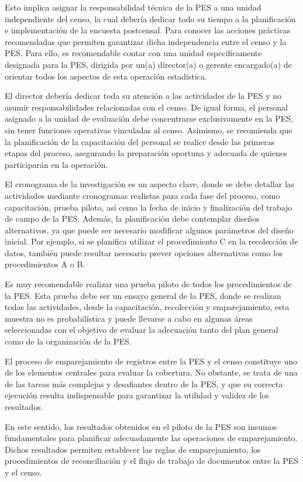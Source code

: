 \documentclass[
  12pt,
]{book}
\begin{document}
Esto implica asignar la responsabilidad técnica de la PES a una unidad independiente del censo, la cual debería dedicar todo su tiempo a la planificación e implementación de la encuesta postcensal. Para conocer las acciones prácticas recomendadas que permiten garantizar dicha independencia entre el censo y la PES. Para ello, es recomendable contar con una unidad específicamente designada para la PES, dirigida por un(a) director(a) o gerente encargado(a) de orientar todos los aspectos de esta operación estadística.

El director debería dedicar toda su atención a las actividades de la PES y no asumir responsabilidades relacionadas con el censo. De igual forma, el personal asignado a la unidad de evaluación debe concentrarse exclusivamente en la PES, sin tener funciones operativas vinculadas al censo. Asimismo, se recomienda que la planificación de la capacitación del personal se realice desde las primeras etapas del proceso, asegurando la preparación oportuna y adecuada de quienes participarán en la operación.

El cronograma de la investigación es un aspecto clave, donde se debe detallar las actividades mediante cronogramas realistas para cada fase del proceso, como capacitación, prueba piloto, así como la fecha de inicio y finalización del trabajo de campo de la PES. Además, la planificación debe contemplar diseños alternativos, ya que puede ser necesario modificar algunos parámetros del diseño inicial. Por ejemplo, si se planifica utilizar el procedimiento C en la recolección de datos, también puede resultar necesario prever opciones alternativas como los procedimientos A o B.

Es muy recomendable realizar una prueba piloto de todos los procedimientos de la PES. Esta prueba debe ser un ensayo general de la PES, donde se realizan todas las actividades, desde la capacitación, recolección y emparejamiento, esta muestra no es probabilística y puede llevarse a cabo en algunas áreas seleccionadas con el objetivo de evaluar la adecuación tanto del plan general como de la organización de la PES.

El proceso de emparejamiento de registros entre la PES y el censo constituye uno de los elementos centrales para evaluar la cobertura. No obstante, se trata de una de las tareas más complejas y desafiantes dentro de la PES, y que su correcta ejecución resulta indispensable para garantizar la utilidad y validez de los resultados.

En este sentido, los resultados obtenidos en el piloto de la PES son insumos fundamentales para planificar adecuadamente las operaciones de emparejamiento. Dichos resultados permiten establecer las reglas de emparejamiento, los procedimientos de reconciliación y el flujo de trabajo de documentos entre la PES y el censo.
\end{document}
